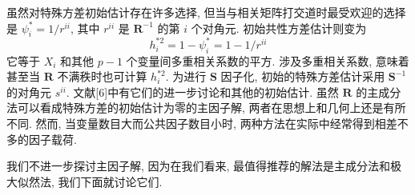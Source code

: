 虽然对特殊方差初始估计存在许多选择, 但当与相关矩阵打交道时最受欢迎的选择是 $\psi_i^*=1/r^{ii}$, 其中 $r^{ii}$ 是 $\mathbf{R}^{-1}$ 的第 $i$ 个对角元. 初始共性方差估计则变为
\label{eq:9-24}
\begin{equation}
h_i^{*2}=1-\psi_i^*=1-1/r^{ii}
\tag{9-24}
\end{equation}
它等于 $X_i$ 和其他 $p-1$ 个变量间多重相关系数的平方. 涉及多重相关系数, 意味着甚至当 $\mathbf{R}$ 不满秩时也可计算 $h_i^{*2}$. 为进行 $\mathbf{S}$ 因子化, 初始的特殊方差估计采用 $\mathbf{S}^{-1}$ 的对角元 $s^{ii}$. 文献[6]中有它们的进一步讨论和其他的初始估计. 虽然 $\mathbf{R}$ 的主成分法可以看成特殊方差的初始估计为零的主因子解, 两者在思想上和几何上还是有所不同. 然而, 当变量数目大而公共因子数目小时, 两种方法在实际中经常得到相差不多的因子载荷.

我们不进一步探讨主因子解, 因为在我们看来, 最值得推荐的解法是主成分法和极大似然法, 我们下面就讨论它们.
